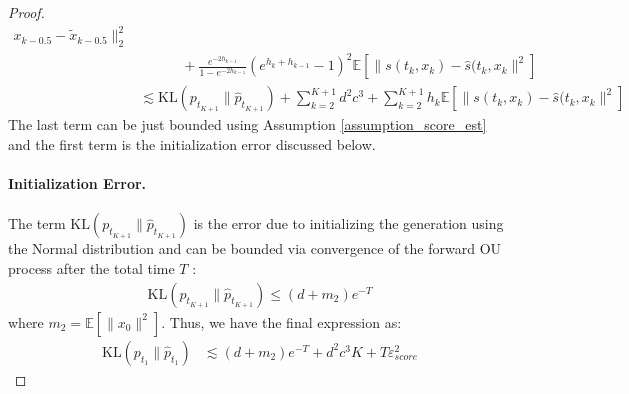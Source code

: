 \documentclass{article}
\newcommand{\KL}[2]{\mathrm{KL}\left(#1 \big\| #2\right)}
\begin{document}
\begin{proof}
\begin{align*}
      x_{k-0.5}-\tilde{x}_{k-0.5}\|_2^2 \\
      &\qquad \quad + {\frac{e^{-2h_{k-1}}}{1-e^{-2h_{k-1}}}}(e^{h_k+h_{k-1}}-1)^2\mathbb{E}[\|s(t_k,x_{k})- \hat{s}(t_k, x_{k}\|^2]\\
      &\lesssim \KL{{p}_{t_{K+1}}}{\hat{p}_{t_{K+1}}} + \sum_{k=2}^{K+1} d^2c^3 + \sum_{k=2}^{K+1}h_k \mathbb{E}[\|s(t_k,x_{k})- \hat{s}(t_k, x_{k}\|^2]
    \end{align*}    
The last term can be just bounded using Assumption \ref{assumption_score_est} and the first term is the initialization error discussed below.  \paragraph{Initialization Error.} The term $ \KL{{p}_{t_{K+1}}}{\hat{p}_{t_{K+1}}}$ is the error due to initializing the generation using the Normal distribution and can be bounded via convergence of the forward OU process after the total time $T$ \cite{chen2022sampling}:
    \begin{align*}
       \KL{{p}_{t_{K+1}}}{\hat{p}_{t_{K+1}}} \leq (d+m_2)e^{-T}
    \end{align*}
    where $m_2 = \mathbb{E}[\|x_0\|^2]$. Thus, we have the final expression as:
    \begin{align*}
         \KL{p_{t_1}}{\hat{p}_{t_1}}
         &\lesssim (d+m_2)e^{-T} + d^2c^3K + T \varepsilon^2_{score} 
    \end{align*}
\end{proof}



   
\end{document}

